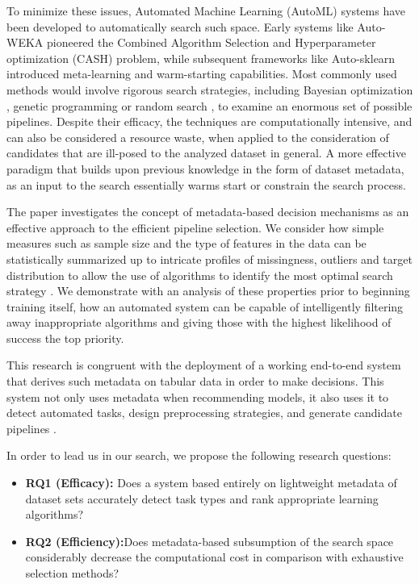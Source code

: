 \documentclass[conference]{llncs}
\begin{document}
  To minimize these issues, Automated Machine Learning (AutoML) systems have been developed to automatically search such space. Early systems like Auto-WEKA \cite{thornton2013auto} pioneered the Combined Algorithm Selection and Hyperparameter optimization (CASH) problem, while subsequent frameworks like Auto-sklearn \cite{feurer2015efficient} introduced meta-learning and warm-starting capabilities. Most commonly used methods would involve rigorous search strategies, including Bayesian optimization \cite{bergstra2011algorithms,falkner2018bohb}, genetic programming \cite{olson2016tpot} or random search \cite{li2017hyperband}, to examine an enormous set of possible pipelines. Despite their efficacy, the techniques are computationally intensive, and can also be considered a resource waste, when applied to the consideration of candidates that are ill-posed to the analyzed dataset in general. A more effective paradigm that builds upon previous knowledge in the form of dataset  metadata, as an input to the search essentially warms start or constrain the search process.

      The paper investigates the concept of metadata-based decision mechanisms as an effective approach to the efficient pipeline selection. We consider how simple measures such as sample size and the type of features in the data can be statistically summarized up to intricate profiles of missingness, outliers and target distribution to allow the use of algorithms to identify the most optimal search strategy \cite{leite2012survey}. We demonstrate with an analysis of these properties prior to beginning training itself, how an automated system can be capable of intelligently filtering away inappropriate algorithms and giving those with the highest likelihood of success the top priority.

   This research is congruent with the deployment of a working end-to-end system that derives such metadata on tabular data in order to make decisions. This system not only uses metadata when recommending models, it also uses it to detect automated tasks, design preprocessing strategies, and generate candidate pipelines \cite{wang2021flaml}. 
  
In order to lead us in our search, we propose the following research questions:
\begin{itemize}
\item  \textbf{RQ1 (Efficacy):} Does a system based entirely on lightweight metadata of dataset sets accurately detect task types and rank appropriate learning algorithms? 
\item  \textbf{RQ2 (Efficiency):}Does metadata-based subsumption of the search space considerably decrease the computational cost in comparison with exhaustive selection methods?
\end{itemize}
\end{document}
